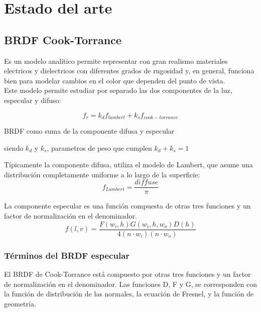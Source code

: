 \chapter{Estado del arte}

\section{BRDF Cook-Torrance}
Es un modelo anal\'itico permite representar con gran realismo materiales electricos y dielectricos con diferentes
grados de rugosidad y, en general, funciona bien para modelar cambios en el color que dependen del punto de vista.\\
Este modelo permite estudiar por separado las dos componentes de la luz, especular y difuso:

\begin{eqfloat}[!htb]
    \begin{equation}
        f_r = k_{d}f_{lambert} + k_sf_{cook-torrance}
    \end{equation}
    \caption{BRDF como suma de la componente difusa y especular}
\end{eqfloat}

siendo $k_d$ y $k_s$, parametros de peso que cumplen $k_d + k_s = 1$
\singlespacing

T\'ipicamente la componente difusa, utiliza el modelo de Lambert, que asume una distribuci\'on completamente uniforme a lo
largo de la superficie:\\

\begin{equation}
f_{Lambert} = \frac{diffuse}{\pi}
\end{equation}
\singlespacing

La componente especular es una funci\'on compuesta de otras tres funciones y un factor de normalizaci\'on en el
denominador.\\

\begin{equation}
    f(l, v) = \frac{F(w_i, h) G(w_i, h, w_o) D(h)} {4(n\cdot{w_i}) (n \cdot{w_o})}
\end{equation}
\singlespacing

    \subsection{T\'erminos del BRDF especular}
        El BRDF de Cook-Torrance est\'a compuesto por otras tres funciones y un factor de normalizaci\'on en el denominador.
        Las funciones D, F y G, se corresponden con la funci\'on de distribuci\'on de las normales, la ecuaci\'on de Fresnel,
        y la funci\'on de geometr\'ia.\\

